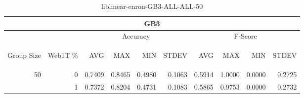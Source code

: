 \begin{center}
\begin{table}[htbp] 
 \begin{center}
\begin{tabular}{ | r | r | r | r | r | r | r | r | r | r |}
\hline
\multicolumn{10}{|c|}{GB3}\\
\hline
 & & \multicolumn{4}{|c|}{Accuracy} & \multicolumn{4}{|c|}{F-Score}\\ \cline{3-10}
\begin{sideways}Group Size\end{sideways} & \begin{sideways}Web1T \%\end{sideways} & \begin{sideways}AVG\end{sideways} & \begin{sideways}MAX\end{sideways} & \begin{sideways}MIN\end{sideways} & \begin{sideways}STDEV\end{sideways} & \begin{sideways}AVG\end{sideways} & \begin{sideways}MAX\end{sideways} & \begin{sideways}MIN\end{sideways} & \begin{sideways}STDEV\end{sideways}\\
\hline
\multirow{1}{*}{50}
 & 0 & 0.7409 & 0.8465 & 0.4980 & 0.1063 & 0.5914 & 1.0000 & 0.0000 & 0.2725\\ \cline{2-10}
 & 1 & 0.7372 & 0.8204 & 0.4731 & 0.1083 & 0.5865 & 0.9753 & 0.0000 & 0.2732\\ \cline{2-10}
\hline
\end{tabular}
\caption{liblinear-enron-GB3-ALL-ALL-50}
\label{table:liblinear-enron-GB3-ALL-ALL-50}
\end{center}
 \end{table}
\end{center}


